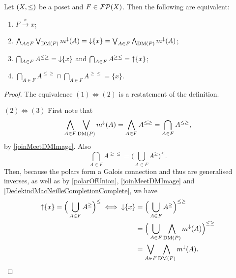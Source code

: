\begin{proposition} \label{orderConvergenceEquivalents}
Let $\sSet{X,\leq}$ be a poset and $F\in\operatorname{\mathcal{FP}}(X)$. Then
the following are equivalent:
\begin{enumerate}
\item $F\overset{\mathfrak{o}}{\longrightarrow} x$;
\item $\bigwedge_{A\in F}\bigvee_{\operatorname{DM}(P)} m^\downarrow(A) = \operatorname{\downarrow}\{x\} = \bigvee_{A\in F}\bigwedge_{\operatorname{DM}(P)} m^\downarrow(A)$;
\item $\bigcap_{A\in F}A^{\leq \geq} = \operatorname{\downarrow} \{x\}$ and $\bigcap_{A\in F}A^{\geq\leq} = \operatorname{\uparrow}\{x\}$;
\item $\bigcap_{A\in F}A^{\leq \geq} \cap \bigcap_{A\in F}A^{\geq\leq} = \{x\}$.
\end{enumerate}
\end{proposition}
\begin{proof}
The equivalence $(1) \Leftrightarrow (2)$ is a restatement of the definition.

$(2) \Leftrightarrow (3)$ First note that
\[ \bigwedge_{A\in F}\bigvee_{\operatorname{DM}(P)} m^\downarrow(A) = \bigwedge_{A\in F}A^{\leq\geq} = \bigcap_{A\in F}A^{\leq\geq}, \]
by \ref{joinMeetDMImage}. Also
\[ \bigcap_{A\in F}A^{\geq\leq} = \Big(\bigcup_{A\in F}A^\geq\Big)^\leq. \]
Then, because the polars form a Galois connection and thus are generalised inverses, as well as by \ref{polarOfUnion}, \ref{joinMeetDMImage} and \ref{DedekindMacNeilleCompletionComplete}, we have
\begin{align*}
\operatorname{\uparrow}\{x\} = \Big(\bigcup_{A\in F}A^\geq\Big)^\leq \iff \operatorname{\downarrow}\{x\} &= \Big(\bigcup_{A\in F}A^\geq\Big)^{\leq\geq} \\
&= \Big(\bigcup_{A\in F}\bigwedge_{\operatorname{DM}(P)}m^\downarrow(A)\Big)^{\leq\geq} \\
&= \bigvee_{A\in F}\bigwedge_{\operatorname{DM}(P)} m^\downarrow(A).
\end{align*}
\end{proof}


